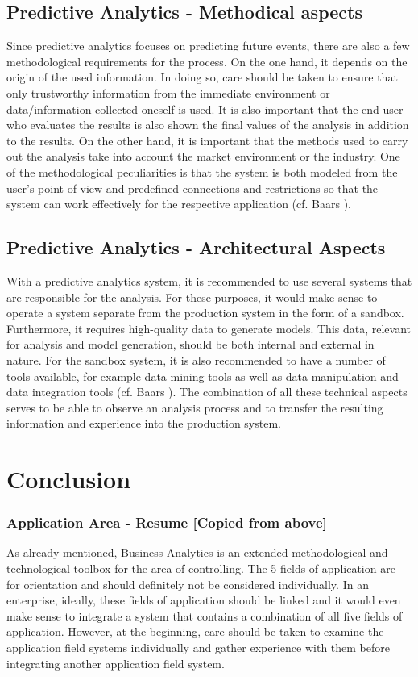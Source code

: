 \documentclass[12pt,twocolumn,twoside]{conference}   %
\begin{document}
\subsection{Predictive Analytics - Methodical aspects}
Since predictive analytics focuses on predicting future events, there are also a few methodological requirements for the process. On the one hand, it depends on the origin of the used information. In doing so, care should be taken to ensure that only trustworthy information from the immediate environment or data/information collected oneself is used. It is also important that the end user who evaluates the results is also shown the final values of the analysis in addition to the results. On the other hand, it is important that the methods used to carry out the analysis take into account the market environment or the industry. One of the methodological peculiarities is that the system is both modeled from the user's point of view and predefined connections and restrictions so that the system can work effectively for the respective application (cf. Baars \cite{1}).

\subsection{Predictive Analytics - Architectural Aspects}
With a predictive analytics system, it is recommended to use several systems that are responsible for the analysis. For these purposes, it would make sense to operate a system separate from the production system in the form of a sandbox. Furthermore, it requires high-quality data to generate models. This data, relevant for analysis and model generation, should be both internal and external in nature. For the sandbox system, it is also recommended to have a number of tools available, for example data mining tools as well as data manipulation and data integration tools (cf. Baars \cite{1}). The combination of all these technical aspects serves to be able to observe an analysis process and to transfer the resulting information and experience into the production system. 

\section{Conclusion}
\subsubsection{Application Area - Resume [Copied from above]}
As already mentioned, Business Analytics is an extended methodological and technological toolbox for the area of controlling. The 5 fields of application are for orientation and should definitely not be considered individually. In an enterprise, ideally, these fields of application should be linked and it would even make sense to integrate a system that contains a combination of all five fields of application. However, at the beginning, care should be taken to examine the application field systems individually and gather experience with them before integrating another application field system. 
\end{document}
